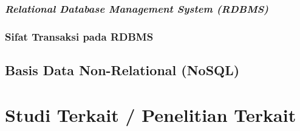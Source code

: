     \subsubsection{\textit{Relational Database Management System (RDBMS)}}

    \subsubsection{Sifat Transaksi pada RDBMS}    

\subsection{Basis Data Non-Relational (NoSQL)}
    
\section{Studi Terkait / Penelitian Terkait}
\blindtext
